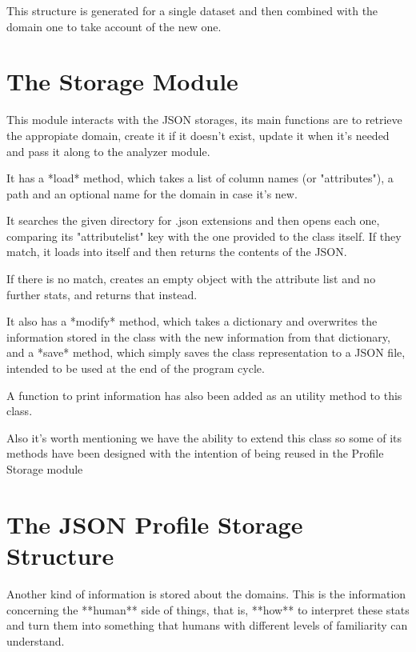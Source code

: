 This structure is generated for a single dataset and then combined with the domain one to take account of the new one.

\section{The Storage Module}
\label{cap2:sec:storage}

This module interacts with the JSON storages, its main functions are to retrieve the appropiate domain, create it if it doesn't exist, update it when it's needed and pass it along to the analyzer module.

It has a *load* method, which takes a list of column names (or "attributes"), a path and an optional name for the domain in case it's new. 

It searches the given directory for .json extensions and then opens each one, comparing its "attributelist" key with the one provided to the class itself. If they match, it loads into itself and then returns the contents of the JSON.

If there is no match, creates an empty object with the attribute list and no further stats, and returns that instead.

It also has a *modify* method, which takes a dictionary and overwrites the information stored in the class with the new information from that dictionary, and a *save* method, which simply saves the class representation to a JSON file, intended to be used at the end of the program cycle.

A function to print information has also been added as an utility method to this class.

Also it's worth mentioning we have the ability to extend this class so some of its methods have been designed with the intention of being reused in the Profile Storage module

\section{The JSON Profile Storage Structure}
\label{cap2:sec:profilejson}

Another kind of information is stored about the domains. This is the information concerning the **human** side of things, that is, **how** to interpret these stats and turn them into something that humans with different levels of familiarity can understand.

